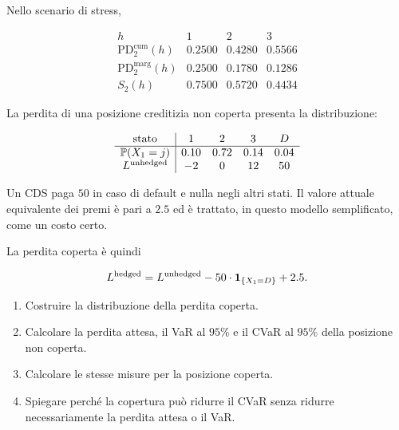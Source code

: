 \begin{exercise}
Nello scenario di stress,

\[
\begin{array}{c|ccc}
h
&
1
&
2
&
3
\\
\hline
\mathrm{PD}^{\mathrm{cum}}_2(h)
&
0.2500
&
0.4280
&
0.5566
\\
\mathrm{PD}^{\mathrm{marg}}_2(h)
&
0.2500
&
0.1780
&
0.1286
\\
S_2(h)
&
0.7500
&
0.5720
&
0.4434
\end{array}
\]

\end{exercise}

\begin{exercise}

\label{ex:cap09-copertura-cds}

La perdita di una posizione creditizia non coperta presenta la
distribuzione:

\[
\begin{array}{c|cccc}
\text{stato}
&
1
&
2
&
3
&
D
\\
\hline
\mathbb{P}(X_1=j)
&
0.10
&
0.72
&
0.14
&
0.04
\\
L^{\mathrm{unhedged}}
&
-2
&
0
&
12
&
50
\end{array}
\]

Un CDS paga $50$ in caso di default e nulla negli altri stati. Il
valore attuale equivalente dei premi \`{e} pari a $2.5$ ed \`{e}
trattato, in questo modello semplificato, come un costo certo.

La perdita coperta \`{e} quindi

\[
L^{\mathrm{hedged}}
=
L^{\mathrm{unhedged}}
-
50\cdot\mathbf{1}_{\{X_1=D\}}
+
2.5.
\]

\begin{enumerate}

\item Costruire la distribuzione della perdita coperta.

\item Calcolare la perdita attesa, il VaR al $95\%$ e il CVaR al
$95\%$ della posizione non coperta.

\item Calcolare le stesse misure per la posizione coperta.

\item Spiegare perch\'{e} la copertura pu\`{o} ridurre il CVaR senza
ridurre necessariamente la perdita attesa o il VaR.

\end{enumerate}


\end{exercise}
